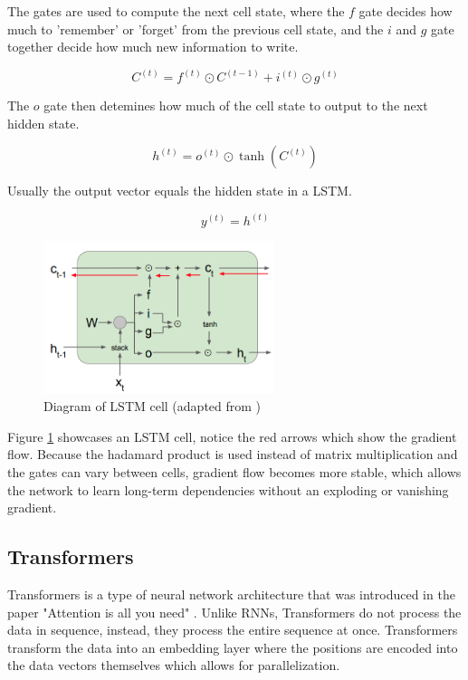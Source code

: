 \documentclass[11pt]{article}
\begin{document}
The gates are used to compute the next cell state, where the $f$ gate decides how much to 'remember' or 'forget' from the previous cell state, and the $i$ and $g$ gate together decide how much new information to write.

\begin{equation} C^{(t)} = f^{(t)} \odot C^{(t-1)} + i^{(t)} \odot g^{(t)} \end{equation}

The $o$ gate then detemines how much of the cell state to output to the next hidden state.

\begin{equation} h^{(t)} = o^{(t)} \odot \tanh(C^{(t)}) \end{equation}

Usually the output vector equals the hidden state in a LSTM.

\begin{equation} y^{(t)} = h^{(t)} \end{equation}

\begin{figure}[h]
\centering
\includegraphics[width=0.6\textwidth]{lstm_diagram.png}
\caption{Diagram of LSTM cell (adapted from \cite{StanfordEngineering2020})}
\label{fig:lstm_diagram}
\end{figure}

Figure \ref{fig:lstm_diagram} showcases an LSTM cell, notice the red arrows which show the gradient flow. Because the hadamard product is used instead of matrix multiplication and the gates can vary between cells, gradient flow becomes more stable, which allows the network to learn long-term dependencies without an exploding or vanishing gradient.
\subsection{Transformers}

Transformers is a type of neural network architecture that was introduced in the paper "Attention is all you need" \cite{DBLP:journals/corr/VaswaniSPUJGKP17}. Unlike RNNs, Transformers do not process the data in sequence, instead, they process the entire sequence at once. Transformers transform the data into an embedding layer where the positions are encoded into the data vectors themselves which allows for parallelization.
\end{document}
